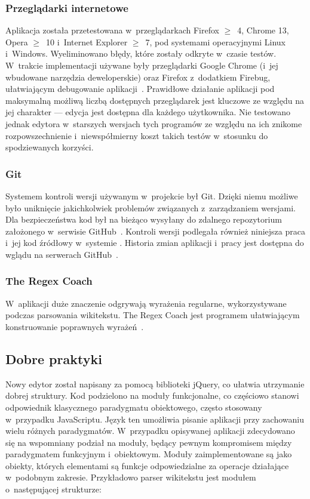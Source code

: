 \subsubsection{Przeglądarki internetowe}
Aplikacja została przetestowana w~przeglądarkach Firefox $\geq$~4, Chrome 13, Opera $\geq$~10 i~Internet Explorer $\geq$~7, pod systemami operacyjnymi Linux i~Windows. Wyeliminowano błędy, które zostały odkryte w~czasie testów. W~trakcie implementacji używane były przeglądarki Google Chrome (i~jej wbudowane narzędzia deweloperskie) oraz Firefox z~dodatkiem Firebug, ułatwiającym debugowanie aplikacji~\cite{firebug}. Prawidłowe działanie aplikacji pod maksymalną możliwą liczbą dostępnych przeglądarek jest kluczowe ze względu na jej charakter --- edycja jest dostępna dla każdego użytkownika. Nie testowano jednak edytora w~starszych wersjach tych programów ze względu na ich znikome rozpowszechnienie i~niewspółmierny koszt takich testów w~stosunku do spodziewanych korzyści.
\subsubsection{Git}
Systemem kontroli wersji używanym w~projekcie był Git. Dzięki niemu możliwe było uniknięcie jakichkolwiek problemów związanych z~zarządzaniem wersjami. Dla bezpieczeństwa kod był na bieżąco wysyłany do zdalnego repozytorium założonego w~serwisie GitHub~\cite{github}. Kontroli wersji podlegała również niniejsza praca i~jej kod źródłowy w~systemie \XeTeX. Historia zmian aplikacji i~pracy jest dostępna do wglądu na serwerach GitHub~\cite{github:wikt}.
\subsubsection{The Regex Coach}
W~aplikacji duże znaczenie odgrywają wyrażenia regularne, wykorzystywane podczas parsowania wikitekstu. The Regex Coach jest programem ułatwiającym konstruowanie poprawnych wyrażeń~\cite{regexcoach}.
\spacer

\subsection{Dobre praktyki}
Nowy edytor został napisany za pomocą biblioteki jQuery, co ułatwia utrzymanie dobrej struktury. Kod podzielono na moduły funkcjonalne, co częściowo stanowi odpowiednik klasycznego paradygmatu obiektowego, często stosowany w~przypadku JavaScriptu. Język ten umożliwia pisanie aplikacji przy zachowaniu wielu różnych paradygmatów. W~przypadku opisywanej aplikacji zdecydowano się na wspomniany podział na moduły, będący pewnym kompromisem między paradygmatem funkcyjnym i~obiektowym. Moduły zaimplementowane są jako obiekty, których elementami są funkcje odpowiedzialne za operacje działające w~podobnym zakresie. Przykładowo parser wikitekstu jest modułem o~następującej strukturze:

